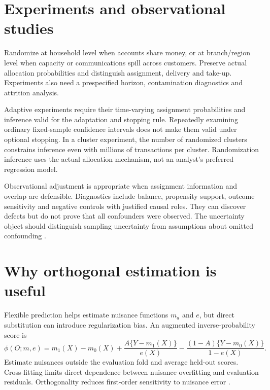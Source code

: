 \section{Experiments and observational studies}
Randomize at household level when accounts share money, or at branch/region
level when capacity or communications spill across customers. Preserve actual
allocation probabilities and distinguish assignment, delivery and take-up.
Experiments also need a prespecified horizon, contamination diagnostics and
attrition analysis.

Adaptive experiments require their time-varying assignment probabilities and
inference valid for the adaptation and stopping rule. Repeatedly examining
ordinary fixed-sample confidence intervals does not make them valid under
optional stopping. In a cluster experiment, the number of randomized
clusters constrains inference even with millions of transactions per cluster.
Randomization inference uses the actual allocation mechanism, not an
analyst's preferred regression model.

Observational adjustment is appropriate when assignment information and
overlap are defensible. Diagnostics include balance, propensity support,
outcome sensitivity and negative controls with justified causal roles.
They can discover defects but do not prove that all confounders were observed.
The uncertainty object should distinguish sampling uncertainty from
assumptions about omitted confounding \citep{ovb2022}.

\section{Why orthogonal estimation is useful}
Flexible prediction helps estimate nuisance functions $m_a$ and $e$, but
direct substitution can introduce regularization bias. An augmented
inverse-probability score is
\begin{equation}
 \phi(O;m,e)=m_1(X)-m_0(X)
 +\frac{A\{Y-m_1(X)\}}{e(X)}
 -\frac{(1-A)\{Y-m_0(X)\}}{1-e(X)}.
 \label{eq:aipw}
\end{equation}
Estimate nuisances outside the evaluation fold and average held-out scores.
Cross-fitting limits direct dependence between nuisance overfitting and
evaluation residuals. Orthogonality reduces first-order sensitivity to
nuisance error \citep{dml2018,wager2025}.

